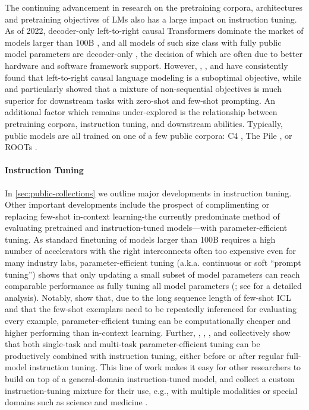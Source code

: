 The continuing advancement in research on the pretraining corpora, architectures and pretraining objectives of LMs also has a large impact on instruction tuning. 
As of 2022, decoder-only left-to-right causal Transformers dominate the market of models larger than 100B \citep{brown2020language,thoppilan2022lamda,rae2021scaling,chowdhery2022palm,hoffmann2022training}, 
and all models of such size class with fully public model parameters are decoder-only \citep{gpt-j,scao2022bloom,zhang2022opt},
the decision of which are often due to better hardware and software framework support. %
However, \citet{raffel2020exploring}, \citet{lewis-etal-2020-bart}, and \citet{tay2022unifying} have consistently found that left-to-right causal language modeling is a suboptimal objective, while \citet{tay2022transcending} and \citet{wang2022language} particularly showed that a mixture of non-sequential objectives is much superior for downstream tasks with zero-shot and few-shot prompting.
An additional factor which remains under-explored is the relationship between pretraining corpora, instruction tuning, and downstream abilities.
Typically, public models are all trained on one of a few public corpora: C4 \citep{raffel2020exploring}, The Pile \citep{gao2020pile}, or ROOTs \citep{laurencconbigscience}.

\vspace{-2mm}
\paragraph{Instruction Tuning} In \cref{sec:public-collections} we outline major developments in instruction tuning. 
Other important developments include the prospect of complimenting or replacing few-shot in-context learning-the currently predominate method of evaluating pretrained and instruction-tuned models—with parameter-efficient tuning.
As standard finetuning of models larger than 100B requires a high number of accelerators with the right interconnects often too expensive even for many industry labs, parameter-efficient tuning (a.k.a. continuous or soft “prompt tuning”) shows that only updating a small subset of model parameters can reach comparable performance as fully tuning all model parameters (\citealp{lester-etal-2021-power,vu-etal-2022-spot,lora}; see \citealp{he2022towards} for a detailed analysis).
Notably, \citet{tfew2022} show that, due to the long sequence length of few-shot ICL and that the few-shot exemplars need to be repeatedly inferenced for evaluating every example, parameter-efficient tuning can be computationally cheaper and higher performing than in-context learning.
Further, \citet{tfew2022}, \citet{vu-etal-2022-spot}, \citet{wei2021finetuned}, and \citet{med-palm} collectively show that both single-task and multi-task parameter-efficient tuning can be productively combined with instruction tuning, either before or after regular full-model instruction tuning.
This line of work makes it easy for other researchers to build on top of a general-domain instruction-tuned model, 
and collect a custom instruction-tuning mixture for their use,
e.g., with multiple modalities \citep{2022_palm_saycan,huang2022inner,multimodal-inst-tuning} or special domains such as science and medicine \citep{minerva,med-palm}. 


